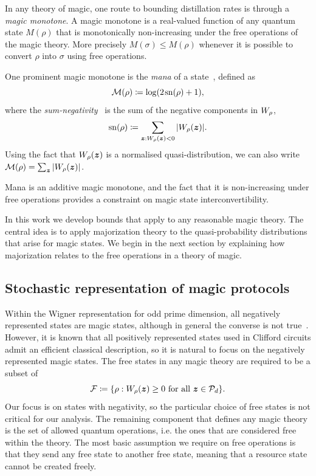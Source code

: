 \documentclass[pra,
aps,
twocolumn,
superscriptaddress,
groupedaddress,
nofootinbib,
reprint
]{revtex4-1}
\begin{document}
In any theory of magic, one route to bounding distillation rates is through a \emph{magic monotone}. A magic monotone is a real-valued function of any quantum state $M(\rho)$ that is monotonically non-increasing under the free operations of the magic theory. More precisely $M(\sigma) \le M(\rho)$ whenever it is possible to convert $\rho$ into $\sigma$ using free operations.

One prominent magic monotone is the \emph{mana} of a state~\cite{cit:veitch2}, defined as
\begin{equation}
    {\mathcal M}(\rho) \coloneqq \log (2\hspace{1pt}{{\rm{sn}}(\rho)}+1),
\end{equation}
where the \emph{sum-negativity}~\cite{cit:veitch2} is the sum of the negative components in $\W{\rho}$,
\begin{equation}
    \sn{\rho} \coloneqq \sum\limits_{\bmz: \W[\bmz]{\rho} < 0} \abs{\W[\bmz]{\rho}}.
\end{equation}
Using the fact that $W_\rho(\boldsymbol{z})$ is a normalised quasi-distribution, we can also write ${\mathcal M}(\rho) = \sum_{\boldsymbol{z}} |W_\rho(\boldsymbol{z})|$.

Mana is an additive magic monotone, and the fact that it is non-increasing under free operations provides a constraint on magic state interconvertibility.

In this work we develop bounds that apply to any reasonable magic theory. The central idea is to apply majorization theory to the quasi-probability distributions that arise for magic states. We begin in the next section by explaining how majorization relates to the free operations in a theory of magic.



\subsection{Stochastic representation of magic protocols}
\label{sec:struc}

Within the Wigner representation for odd prime dimension, all negatively represented states are magic states, although in general the converse is not true~\cite{cit:veitch}. However, it is known that all positively represented states used in Clifford circuits admit an efficient classical description, so it is natural to focus on the negatively represented magic states. The free states in any magic theory are required to be a subset of
\begin{equation}
    \F \coloneqq \{ \rho: \W[\bmz]{\rho} \geq 0 \text{ for all } \bmz \in \cal{P}_d\}.
\end{equation}
Our focus is on states with negativity, so the particular choice of free states is not critical for our analysis. The remaining component that defines any magic theory is the set of allowed quantum operations, i.e. the ones that are considered free within the theory. The most basic assumption we require on free operations is that they send any free state to another free state, meaning that a resource state cannot be created freely.
\end{document}
